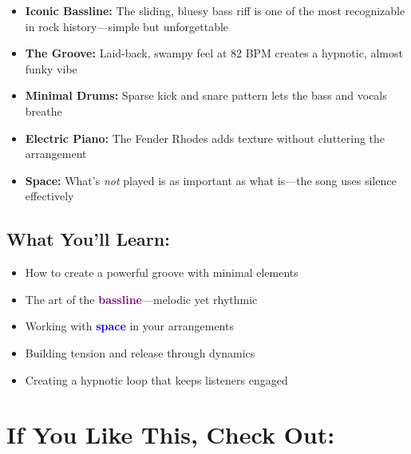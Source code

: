 \documentclass[11pt,letterpaper]{article}
\newcommand{\purple}[1]{\textcolor{purple}{\textbf{#1}}}
\newcommand{\bluepurple}[1]{\textcolor{blue}{\textbf{#1}}}
\begin{document}
\begin{itemize}[leftmargin=*]
\item \textbf{Iconic Bassline:} The sliding, bluesy bass riff is one of the most recognizable in rock history—simple but unforgettable
\item \textbf{The Groove:} Laid-back, swampy feel at 82 BPM creates a hypnotic, almost funky vibe
\item \textbf{Minimal Drums:} Sparse kick and snare pattern lets the bass and vocals breathe
\item \textbf{Electric Piano:} The Fender Rhodes adds texture without cluttering the arrangement
\item \textbf{Space:} What's \textit{not} played is as important as what is—the song uses silence effectively
\end{itemize}

\subsection*{What You'll Learn:}

\begin{itemize}[leftmargin=*]
\item How to create a powerful groove with minimal elements
\item The art of the \purple{bassline}—melodic yet rhythmic
\item Working with \bluepurple{space} in your arrangements
\item Building tension and release through dynamics
\item Creating a hypnotic loop that keeps listeners engaged
\end{itemize}

\vspace{0.5cm}

\section*{If You Like This, Check Out:}
\end{document}
